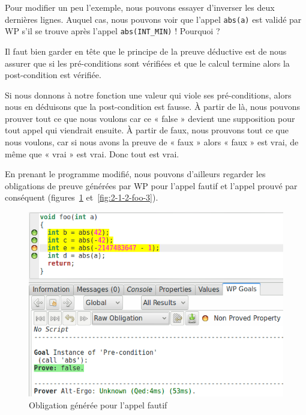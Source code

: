 \documentclass[12pt,francais,]{scrbook}
\begin{document}
Pour modifier un peu l'exemple, nous pouvons essayer d'inverser les deux
dernières lignes. Auquel cas, nous pouvons voir que l'appel
\texttt{abs(a)} est validé par WP s'il se trouve après l'appel
\texttt{abs(INT\_MIN)} ! Pourquoi ?

Il faut bien garder en tête que le principe de la preuve déductive est
de nous assurer que si les pré-conditions sont vérifiées et que le
calcul termine alors la post-condition est vérifiée.

Si nous donnons à notre fonction une valeur qui viole ses
pré-conditions, alors nous en déduisons que la post-condition est
fausse. À partir de là, nous pouvons prouver tout ce que nous voulons
car ce « false » devient une supposition pour tout appel qui viendrait
ensuite. À partir de faux, nous prouvons tout ce que nous voulons, car
si nous avons la preuve de « faux » alors « faux » est vrai, de même que
« vrai » est vrai. Donc tout est vrai.

En prenant le programme modifié, nous pouvons d'ailleurs regarder les
obligations de preuve générées par WP pour l'appel fautif et l'appel
prouvé par conséquent (figures~\ref{fig:2-1-2-foo-2} et~\ref{fig:2-1-2-foo-3}).

\begin{figure}[htbp]
\centering
\includegraphics[scale=0.5]{2-1-2-foo-2.png}
\caption{Obligation générée pour l'appel fautif}
\label{fig:2-1-2-foo-2}
\end{figure}
\end{document}
